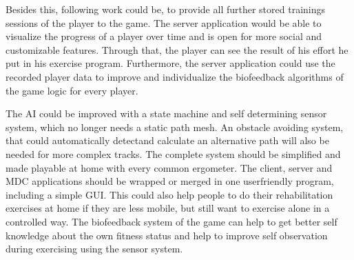 \begin{multicols}{2}
Besides this, following work could be, to provide all further stored trainings sessions of the player to the game. The server application would be able to visualize the progress of a player over time and is open for more social and customizable features. Through that, the player can see the result of his effort he put in his exercise program. Furthermore, the server application could use the recorded player data to improve and individualize the biofeedback algorithms of the game logic for every player.

The AI could be improved with a state machine and self determining sensor system, which no
longer needs a static path mesh. An obstacle avoiding system, that could automatically detectand calculate an alternative path will also be needed for more complex tracks.
The complete system should be simplified and made playable at home with every common
ergometer. The client, server and MDC applications should be wrapped or merged in one userfriendly program, including a simple GUI. This could also help people to do their rehabilitation exercises at home if they are less mobile, but still want to exercise alone in a controlled way. The biofeedback system of the game can help to get better self knowledge about the own fitness status and help to improve self observation during exercising using the sensor system.

\end{multicols}







